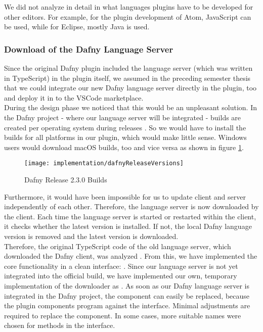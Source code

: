We did not analyze in detail in what languages plugins have to be developed for other editors.
For example, for the plugin development of Atom, JavaScript \cite{plugin-atom} can be used,
while for Eclipse, mostly Java \cite{plugin-eclipse} is used.

\subsubsection{Download of the Dafny Language Server}
\label{section:implementation:client:download}
Since the original Dafny plugin included the language server (which was written in TypeScript) in the plugin itself,
we assumed in the preceding semester thesis that we could integrate our new Dafny language server directly in the plugin, too
and deploy it in to the VSCode marketplace. \\

During the design phase we noticed that this would be an unpleasant solution.
In the Dafny project - where our language server will be integrated - builds
are created per operating system during releases \cite{dafny_lang_builds}.
So we would have to install the builds for all platforms in our plugin,
which would make little sense.
Windows users would download macOS builds, too and vice versa as shown in figure \ref{fig:dafnyReleaseVersions}.

\begin{figure}[H]
    \centering
    \texttt{[image: implementation/dafnyReleaseVersions]}
    \caption{Dafny Release 2.3.0 Builds}
    \label{fig:dafnyReleaseVersions}
\end{figure}

Furthermore, it would have been impossible for us to update client and server independently of each other.
Therefore, the language server is now downloaded by the client.
Each time the language server is started or restarted within the client,
it checks whether the latest version is installed.
If not, the local Dafny language version is removed and the latest version is downloaded. \\

Therefore, the original TypeScript code of the old language server,
which downloaded the Dafny client, was analyzed \cite{ts_dafny_installer}.
From this, we have implemented the core functionality in a clean interface: \linebreak
{}.
Since our language server is not yet integrated into the official build,
we have implemented our own, temporary implementation of the downloader as .
As soon as our Dafny language server is integrated in the Dafny project,
the component can easily be replaced, because the plugin components program against the interface.
Minimal adjustments are required to replace the component. In some cases, more suitable names were chosen for methods in the interface.

